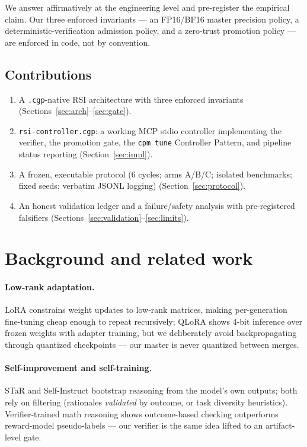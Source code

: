 \documentclass[11pt,a4paper]{article}
\begin{document}
We answer affirmatively at the engineering level and pre-register the
empirical claim. Our three enforced invariants --- an FP16/BF16 master
precision policy, a deterministic-verification admission policy, and a
zero-trust promotion policy --- are enforced in code, not by convention.

\subsection{Contributions}
\begin{enumerate}[leftmargin=1.6em]
  \item A \texttt{.cgp}-native RSI architecture with three enforced invariants
        (Sections~\ref{sec:arch}--\ref{sec:gate}).
  \item \texttt{rsi-controller.cgp}: a working MCP stdio controller implementing
        the verifier, the promotion gate, the \texttt{cpm tune} Controller
        Pattern, and pipeline status reporting (Section~\ref{sec:impl}).
  \item A frozen, executable protocol (6 cycles; arms A/B/C; isolated
        benchmarks; fixed seeds; verbatim JSONL logging)
        (Section~\ref{sec:protocol}).
  \item An honest validation ledger and a failure/safety analysis with
        pre-registered falsifiers (Sections~\ref{sec:validation}--\ref{sec:limits}).
\end{enumerate}

\section{Background and related work}

\paragraph{Low-rank adaptation.} LoRA \cite{hu2022lora} constrains weight
updates to low-rank matrices, making per-generation fine-tuning cheap enough
to repeat recursively; QLoRA \cite{dettmers2023qlora} shows 4-bit inference
over frozen weights with adapter training, but we deliberately avoid
backpropagating through quantized checkpoints --- our master is never
quantized between merges.

\paragraph{Self-improvement and self-training.} STaR \cite{zelikman2022star}
and Self-Instruct \cite{wang2023selfie} bootstrap reasoning from the model's
own outputs; both rely on filtering (rationales \emph{validated} by outcome,
or task diversity heuristics). Verifier-trained math reasoning
\cite{wei2022verifiers} shows outcome-based checking outperforms reward-model
pseudo-labels --- our verifier is the same idea lifted to an artifact-level
gate.
\end{document}
